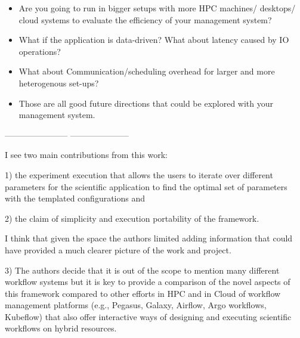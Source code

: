 \begin{itemize}
\begin{itemize}
\item \OK Are you going to run in bigger setups with more  HPC machines/ desktops/ cloud systems to evaluate the efficiency of your management system?

\item \OK What if the application is data-driven? What about latency caused by IO operations?

\item \OK What about  Communication/scheduling overhead for larger and more heterogenous set-ups? 

\item \OK Those are all good future directions that could be explored with your management system.

\end{itemize}

\end{itemize}


----------------------- \OK {} ---------------------


I see two main contributions from this work: 

1) \OK the experiment execution that allows the users to iterate over different parameters for the scientific application to find the optimal set of parameters with the templated configurations and 

2) \OK the claim of simplicity and execution portability of the framework.


 I think that given the space the authors limited adding information that could have provided a much clearer picture of the work and project. 

 
 
 3) \OK The authors decide that it is out of the scope to mention many different workflow systems but it is key to provide a comparison of the novel aspects of this framework compared to other efforts in HPC and in Cloud of workflow management platforms  (e.g., Pegasus, Galaxy, Airflow, Argo workflows, Kubeflow) that also offer interactive ways of designing and executing scientific workflows on hybrid resources. 

\OK {}
 

